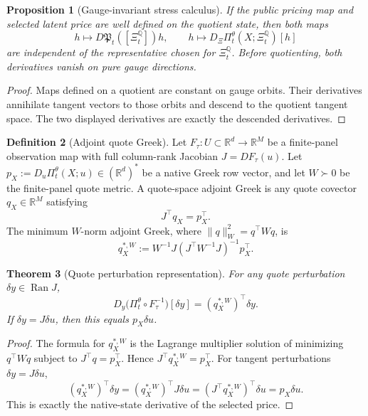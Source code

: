 \documentclass[11pt,a4paper]{amsart}
\theoremstyle{plain}
\newtheorem{theorem}{Theorem}[section]
\newtheorem{proposition}[theorem]{Proposition}
\theoremstyle{definition}
\newtheorem{definition}[theorem]{Definition}
\theoremstyle{remark}
\DeclareMathOperator{\Ran}{Ran}
\newcommand{\R}{\mathbb{R}}
\newcommand{\QQ}{\mathbb{Q}}
\begin{document}
\begin{proposition}[Gauge-invariant stress calculus]\label{prop:gauge-invariant-stress-calculus}
If the public pricing map and selected latent price are well defined on the quotient state, then
both maps
\[
        h\mapsto D\mathfrak P_t([\Xi_t^\QQ])h,
        \qquad
        h\mapsto D_\Xi\Pi_t^\theta(X;\Xi_t^\QQ)[h]
\]
are independent of the representative chosen for \(\Xi_t^\QQ\).  Before quotienting, both
derivatives vanish on pure gauge directions.
\end{proposition}

\begin{proof}
Maps defined on a quotient are constant on gauge orbits.  Their derivatives annihilate tangent
vectors to those orbits and descend to the quotient tangent space.  The two displayed
derivatives are exactly the descended derivatives.
\end{proof}

\begin{definition}[Adjoint quote Greek]\label{def:adjoint-quote-greek}
Let \(F_\tau:U\subset\R^d\to\R^M\) be a finite-panel observation map with full column-rank
Jacobian \(J=DF_\tau(u)\).  Let \(p_X:=D_u\Pi_t^\theta(X;u)\in(\R^d)^*\) be a native Greek row
vector, and let \(W\succ0\) be the finite-panel quote metric.  A quote-space adjoint Greek is any
quote covector \(q_X\in\R^M\) satisfying
\[
        J^\top q_X=p_X^\top .
\]
The minimum \(W\)-norm adjoint Greek, where \(\|q\|_W^2=q^\top Wq\), is
\[
        q_X^{*,W}:=
        W^{-1}J(J^\top W^{-1}J)^{-1}p_X^\top .
\]
\end{definition}

\begin{theorem}[Quote perturbation representation]\label{thm:quote-perturbation-greek}
For any quote perturbation \(\delta y\in\Ran J\),
\[
        D_y\bigl(\Pi_t^\theta\circ F_\tau^{-1}\bigr)[\delta y]
        =
        (q_X^{*,W})^\top\delta y .
\]
If \(\delta y=J\delta u\), then this equals \(p_X\delta u\).
\end{theorem}

\begin{proof}
The formula for \(q_X^{*,W}\) is the Lagrange multiplier solution of minimizing
\(q^\top Wq\) subject to \(J^\top q=p_X^\top\).  Hence
\(J^\top q_X^{*,W}=p_X^\top\).  For tangent perturbations \(\delta y=J\delta u\),
\[
        (q_X^{*,W})^\top\delta y
        =
        (q_X^{*,W})^\top J\delta u
        =
        (J^\top q_X^{*,W})^\top\delta u
        =
        p_X\delta u.
\]
This is exactly the native-state derivative of the selected price.
\end{proof}
\end{document}
